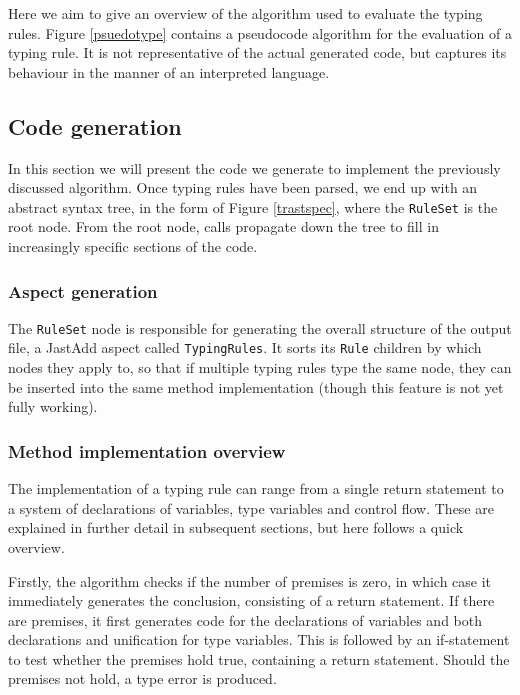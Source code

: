 \documentclass[nofilelist]{cslthse-msc}
\newcommand{\CR}[1]{\textcolor{green!60!black}{[\textbf{CR}:#1]}}
\begin{document}
Here we aim to give an overview of the algorithm used to evaluate the typing rules.
Figure \ref{psuedotype} contains a pseudocode algorithm for the evaluation of a typing rule.
It is not representative of the actual generated code, but captures its behaviour in the manner of an interpreted language.

\subsection{Code generation}\label{codegeneration}

In this section we will present the code we generate to implement the previously discussed algorithm.
Once typing rules have been parsed, we end up with an abstract syntax tree, in the form of Figure \ref{trastspec}, where the \lstinline{RuleSet} is the root node.
From the root node, calls propagate down the tree to fill in increasingly specific sections of the code.




\subsubsection{Aspect generation}
The \lstinline{RuleSet} node is responsible for generating the overall structure of the output file, a JastAdd aspect called \lstinline{TypingRules}.
It sorts its \lstinline{Rule} children by which nodes they apply to, so that if multiple typing rules type the same node, they can be inserted into the same method implementation (though this feature is not yet fully working).

\subsubsection{Method implementation overview}
The implementation of a typing rule can range from a single return statement to a system of declarations of variables, type variables and control flow.
These are explained in further detail in subsequent sections, but here follows a quick overview.

Firstly, the algorithm checks if the number of premises is zero, in which case it immediately generates the conclusion, consisting of a return statement.
If there are premises, it first generates code for the declarations of variables and both declarations and unification for type variables.
This is followed by an if-statement to test whether the premises hold true, containing a return statement.
Should the premises not hold, a type error is produced.
\end{document}
